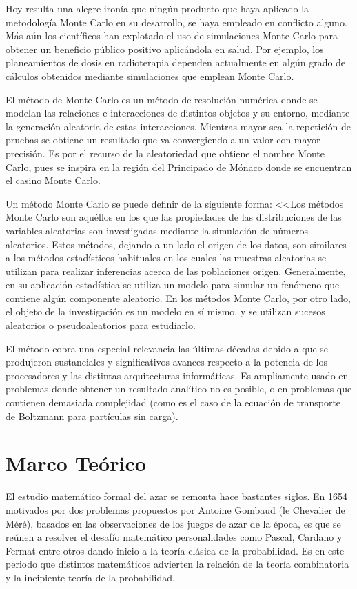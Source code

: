 \documentclass{rbf}
\begin{document}
Hoy resulta una alegre ironía que ningún producto que haya aplicado la metodología Monte Carlo en su desarrollo, se haya empleado en conflicto alguno. Más aún los científicos han explotado el uso de simulaciones Monte Carlo para obtener un beneficio público positivo aplicándola en salud. Por ejemplo, los planeamientos de dosis en radioterapia dependen actualmente en algún grado de cálculos obtenidos mediante simulaciones que emplean Monte Carlo.

El método de Monte Carlo es un método de resolución numérica donde se modelan las relaciones e interacciones de distintos objetos y su entorno, mediante la generación aleatoria de estas interacciones. Mientras mayor sea la repetición de pruebas se obtiene un resultado que va convergiendo a un valor con mayor precisión. Es por el recurso de la aleatoriedad que obtiene el nombre Monte Carlo, pues se inspira en la región del Principado de Mónaco donde se encuentran el casino Monte Carlo.

Un método Monte Carlo se puede definir de la siguiente forma: <<Los métodos Monte Carlo son aquéllos en los que las propiedades de las distribuciones de las variables aleatorias son investigadas mediante la simulación de números aleatorios. Estos métodos, dejando a un lado el origen de los datos, son similares a los métodos estadísticos habituales en los cuales las muestras aleatorias se utilizan para realizar inferencias acerca de las poblaciones origen. Generalmente, en su aplicación estadística se utiliza un modelo para simular un fenómeno que contiene algún componente aleatorio. En los métodos Monte Carlo, por otro lado, el objeto de la investigación es un modelo en sí mismo, y se utilizan sucesos aleatorios o pseudoaleatorios para estudiarlo.\cite{gent}

El método cobra una especial relevancia las últimas décadas debido a que se produjeron sustanciales y significativos avances respecto a la potencia de los procesadores y las distintas arquitecturas informáticas. Es ampliamente usado en problemas donde obtener un resultado analítico no es posible, o en problemas que contienen demasiada complejidad (como es el caso de la ecuación de transporte de Boltzmann para partículas sin carga).\cite{biela}
\section{Marco Teórico}
El estudio matemático formal del azar se remonta hace bastantes siglos. En 1654 motivados por dos problemas propuestos por Antoine Gombaud (le Chevalier de Méré), basados en las observaciones de los juegos de azar de la época, es que se reúnen a resolver el desafío matemático personalidades como Pascal, Cardano y Fermat entre otros dando inicio a la teoría clásica de la probabilidad. Es en este periodo que distintos matemáticos advierten la relación de la teoría combinatoria y la incipiente teoría de la probabilidad.
\end{document}
